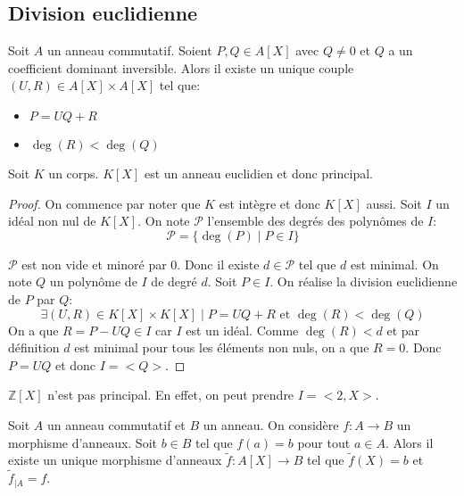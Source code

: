 \subsection{Division euclidienne}

\begin{prop}
	Soit $A$ un anneau commutatif. Soient $P, Q \in A[X]$ avec $Q \neq 0$ et
	$Q$ a un coefficient dominant inversible. Alors il existe un unique couple
	$(U, R) \in A[X] \times A[X]$ tel que:
	\begin{itemize}
		\item $P = UQ + R$
		\item $\deg(R) < \deg(Q)$
	\end{itemize}
\end{prop}

\begin{prop}
	Soit $K$ un corps. $K[X]$ est un anneau euclidien et donc principal.
\end{prop}

\begin{proof}
	On commence par noter que $K$ est intègre et donc $K[X]$ aussi.
	Soit $I$ un idéal non nul de $K[X]$. On note $\mathcal{P}$ l'ensemble des degrés des polynômes de $I$:
	\[\mathcal{P} = \{ \deg(P) \mid P \in I \}\]

	$\mathcal{P}$ est non vide et minoré par $0$. Donc il existe $d \in \mathcal{P}$ tel que $d$ est minimal.
	On note $Q$ un polynôme de $I$ de degré $d$. Soit $P \in I$. On réalise la division euclidienne de $P$ par $Q$:
	\[ \exists (U, R) \in K[X] \times K[X] \mid P = UQ + R \text{ et } \deg(R) < \deg(Q) \]
	On a que $R = P - UQ \in I$  car $I$ est un idéal. Comme $\deg(R) < d$ et par définition $d$ est minimal pour
	tous les éléments non nuls, on a que $R = 0$. Donc $P = UQ$ et donc $I = <Q>$.
\end{proof}


\begin{example}
	$\mathbb{Z}[X]$ n'est pas principal. En effet, on peut prendre $I = <2, X>$.
\end{example}

\begin{theorem}\label{thm:prop_univ_anneau_poly}
	Soit $A$ un anneau commutatif et $B$ un anneau. On considère $f: A \to B$ un morphisme d'anneaux.
	Soit $b \in B$ tel que $f(a) = b$ pour tout $a \in A$. Alors il existe un unique morphisme d'anneaux
	$\tilde{f}: A[X] \to B$ tel que $\tilde{f}(X) = b$ et $\tilde{f}_{\mid A} = f$.
\end{theorem}

